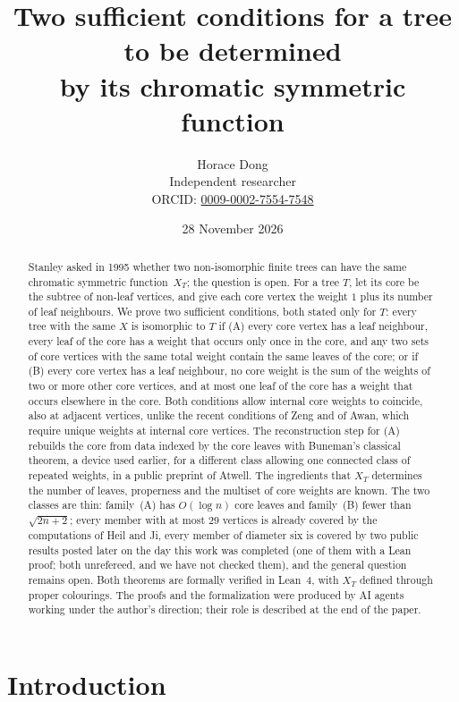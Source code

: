 \documentclass[11pt]{article}
\title{Two sufficient conditions for a tree to be determined\\ by its chromatic symmetric function}
\author{Horace Dong\\ \small Independent researcher\\
\small ORCID: \href{https://orcid.org/0009-0002-7554-7548}{0009-0002-7554-7548}}
\date{28 November 2026}
\theoremstyle{definition}
\theoremstyle{remark}
\begin{document}
\sloppy
\maketitle

\begin{abstract}
Stanley asked in 1995 whether two non-isomorphic finite trees can have the same
chromatic symmetric function~$X_T$; the question is open. For a tree $T$, let
its core be the subtree of non-leaf vertices, and give each core vertex the
weight $1$ plus its number of leaf neighbours. We prove two sufficient
conditions, both stated only for $T$: every tree with the same $X$ is isomorphic
to $T$ if (A) every core vertex has a leaf neighbour, every leaf of the core has
a weight that occurs only once in the core, and any two sets of core vertices
with the same total weight contain the same leaves of the core; or if (B) every
core vertex has a leaf neighbour, no core weight is the sum of the weights of
two or more other core vertices, and at most one leaf of the core has a weight
that occurs elsewhere in the core. Both conditions allow internal core weights
to coincide, also at adjacent vertices, unlike the recent conditions of Zeng
and of Awan, which require unique weights at internal core vertices. The
reconstruction step for (A) rebuilds the core from data indexed by the core
leaves with Buneman's classical theorem, a device used earlier, for a different
class allowing one connected class of repeated weights, in a public preprint of
Atwell. The ingredients that $X_T$
determines the number of leaves, properness and the multiset of core weights are
known. The two classes are thin: family~(A) has $O(\log n)$ core leaves and
family~(B) fewer than $\sqrt{2n+2}$; every member with at most $29$ vertices is
already covered by the computations of Heil and Ji, every member of diameter six
is covered by two public results posted later on the day this work was completed
(one of them with a Lean proof; both unrefereed, and we have not checked them),
and the general question remains open. Both theorems are formally verified in Lean~4, with $X_T$ defined
through proper colourings. The proofs and the formalization were produced by AI
agents working under the author's direction; their role is described at the end
of the paper.
\end{abstract}

\section{Introduction}\label{sec:intro}
\end{document}
